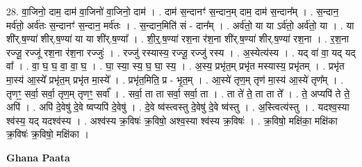 \documentclass[17pt]{extarticle}
\begin{document}
28. वा॒जिनो॒ दाम॒ दाम॑ वा॒जिनो॑ वा॒जिनो॒ दाम॑ । . दाम॑ स॒न्दानꣳ॑ स॒न्दान॒म् दाम॒ दाम॑ स॒न्दान᳚म् । . स॒न्दान॒ मर्व॑तो॒ अर्व॑तः स॒न्दानꣳ॑ स॒न्दान॒ मर्व॑तः । . स॒न्दान॒मिति॑ सं - दान᳚म् । . अर्व॑तो॒ या या ऽर्व॑तो॒ अर्व॑तो॒ या । . या शी॑र्.ष॒ण्या॑ शीर्.ष॒ण्या॑ या या शी॑र्.ष॒ण्या᳚ । . शी॒र्॒.ष॒ण्या॑ रश॒ना र॑श॒ना शी॑र्.ष॒ण्या॑ शीर्.ष॒ण्या॑ रश॒ना । . र॒श॒ना रज्जू॒ रज्जू॑ रश॒ना र॑श॒ना रज्जुः॑ । . रज्जु॑ रस्यास्य॒ रज्जू॒ रज्जु॑ रस्य । . अ॒स्येत्य॑स्य । . यद् वा॑ वा॒ यद् यद् वा᳚ । . वा॒ घ॒ घ॒ वा॒ वा॒ घ॒ । . घा॒ स्या॒ स्य॒ घ॒ घा॒ स्य॒ । . अ॒स्य॒ प्रभृ॑त॒म् प्रभृ॑त मस्यास्य॒ प्रभृ॑तम् । . प्रभृ॑त मा॒स्य॑ आ॒स्ये᳚ प्रभृ॑त॒म् प्रभृ॑त मा॒स्ये᳚ । . प्रभृ॑त॒मिति॒ प्र - भृ॒त॒म् । . आ॒स्ये॑ तृण॒म् तृण॑ मा॒स्य॑ आ॒स्ये॑ तृण᳚म् । . तृणꣳ॒॒ सर्वा॒ सर्वा॒ तृण॒म् तृणꣳ॒॒ सर्वा᳚ । . सर्वा॒ ता ता सर्वा॒ सर्वा॒ ता । . ता ते॑ ते॒ ता ता ते᳚ । . ते॒ अप्यपि॑ ते ते॒ अपि॑ । . अपि॑ दे॒वेषु॑ दे॒वे ष्वप्यपि॑ दे॒वेषु॑ । . दे॒वे ष्व॑स्त्वस्तु दे॒वेषु॑ दे॒वे ष्व॑स्तु । . अ॒स्त्वित्य॑स्तु । . यदश्व॒स्या श्व॑स्य॒ यद् यदश्व॑स्य । . अश्व॑स्य क्र॒विषः॑ क्र॒विषो॒ अश्व॒स्या श्व॑स्य क्र॒विषः॑ । . क्र॒विषो॒ मक्षि॑का॒ मक्षि॑का क्र॒विषः॑ क्र॒विषो॒ मक्षि॑का । \newline

\textbf{Ghana Paata } \newline
\end{document}
